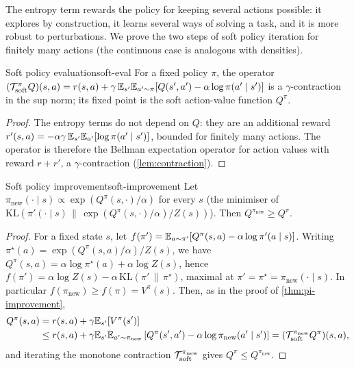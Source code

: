 The entropy term rewards the policy for keeping several actions possible:
it explores by construction, it learns several ways of solving a task, and
it is more robust to perturbations. We prove the two steps of soft policy
iteration for finitely many actions (the continuous case is analogous with
densities).

\begin{proposition}{Soft policy evaluation}{soft-eval}
  For a fixed policy $\pi$, the operator $(\mathcal{T}^\pi_{\mathrm{soft}} Q)(s, a) =
  r(s, a) + \gamma\, \mathbb{E}_{s'} \mathbb{E}_{a' \sim \pi}[Q(s', a') - \alpha \log \pi(a'
  \mid s')]$ is a $\gamma$-contraction in the sup norm; its fixed point is
  the soft action-value function $Q^\pi$.
\end{proposition}

\begin{proof}
  The entropy terms do not depend on $Q$: they are an additional reward
  $r'(s, a) = -\alpha \gamma\, \mathbb{E}_{s'} \mathbb{E}_{a'}[\log \pi(a' \mid s')]$,
  bounded for finitely many actions. The operator is therefore the Bellman
  expectation operator for action values with reward $r + r'$, a
  $\gamma$-contraction (\cref{lem:contraction}).
\end{proof}

\begin{lemma}{Soft policy improvement}{soft-improvement}
  Let $\pi_{\mathrm{new}}(\cdot \mid s) \propto \exp(Q^{\pi}(s, \cdot) /
  \alpha)$ for every $s$ (the minimiser of $\mathrm{KL}(\pi'(\cdot \mid s)
  \,\|\, \exp(Q^\pi(s, \cdot)/\alpha) / Z(s))$). Then $Q^{\pi_{\mathrm{new}}}
  \geq Q^\pi$.
\end{lemma}

\begin{proof}
  For a fixed state $s$, let $f(\pi') = \mathbb{E}_{a \sim \pi'}[Q^\pi(s, a) - \alpha
  \log \pi'(a \mid s)]$. Writing $\pi^\star(a) = \exp(Q^\pi(s, a)/\alpha) /
  Z(s)$, we have $Q^\pi(s, a) = \alpha \log \pi^\star(a) + \alpha \log Z(s)$,
  hence $f(\pi') = \alpha \log Z(s) - \alpha\, \mathrm{KL}(\pi' \,\|\,
  \pi^\star)$, maximal at $\pi' = \pi^\star = \pi_{\mathrm{new}}(\cdot \mid
  s)$. In particular $f(\pi_{\mathrm{new}}) \geq f(\pi) = V^\pi(s)$. Then, as
  in the proof of \cref{thm:pi-improvement},
  \begin{align*}
    Q^\pi(s, a) &= r(s, a) + \gamma \mathbb{E}_{s'}[V^\pi(s')] \\
    &\leq r(s, a) + \gamma \mathbb{E}_{s'} \mathbb{E}_{a' \sim \pi_{\mathrm{new}}}
      \left[Q^\pi(s', a') - \alpha \log \pi_{\mathrm{new}}(a' \mid s')
      \right] = (\mathcal{T}^{\pi_{\mathrm{new}}}_{\mathrm{soft}} Q^\pi)(s, a),
  \end{align*}
  and iterating the monotone contraction $\mathcal{T}^{\pi_{\mathrm{new}}}_{\mathrm
  {soft}}$ gives $Q^\pi \leq Q^{\pi_{\mathrm{new}}}$.
\end{proof}

